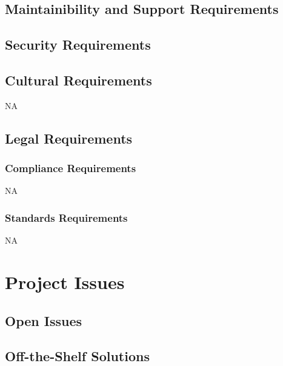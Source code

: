 \documentclass[12pt]{article}
\begin{document}
\subsection{Maintainibility and Support Requirements} %

\subsection{Security Requirements} %

\subsection{Cultural Requirements} %
NA

\subsection{Legal Requirements} %
\subsubsection{Compliance Requirements}
NA
\subsubsection{Standards Requirements}
NA

\section{Project Issues}

\subsection{Open Issues} %

\subsection{Off-the-Shelf Solutions} %
\end{document}
